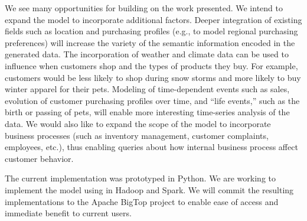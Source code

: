 \documentclass[conference]{IEEEtran}
\begin{document}
We see many opportunities for building on the work presented.  We intend to expand the model to incorporate additional factors.  Deeper integration of existing fields such as location and purchasing profiles (e.g., to model regional purchasing preferences) will increase the variety of the semantic information encoded in the generated data. The incorporation of weather and climate data can be used to influence when customers shop and the types of products they buy. For example, customers would be less likely to shop during snow storms and more likely to buy winter apparel for their pets. Modeling of time-dependent events such as sales, evolution of customer purchasing profiles over time, and ``life events,'' such as the birth or passing of pets, will enable more interesting time-series analysis of the data.  We would also like to expand the scope of the model to incorporate business processes (such as inventory management, customer complaints, employees, etc.), thus enabling queries about how internal business process affect customer behavior.

The current implementation was prototyped in Python.  We are working to implement the model using in Hadoop and Spark.  We will commit the resulting implementations to the Apache BigTop project to enable ease of access and immediate benefit to current users. 



 


%
%
\end{document}
